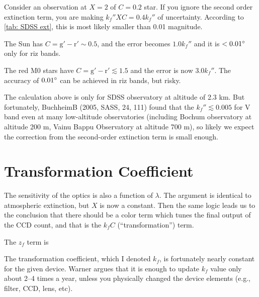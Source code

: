 \begin{ex}
Consider an observation at $ X = 2 $ of $ C = 0.2 $ star. If you ignore the second order extinction term, you are making $ k_f'' XC = 0.4 k_f'' $ of uncertainty. According to \cref{tab: SDSS ext}, this is most likely smaller than 0.01 magnitude. 

The Sun has $ C = \mathrm{g' - r'} \sim 0.5 $, and the error becomes $ 1.0 k_f'' $ and it is $ < \m{0.01} $ only for riz bands.

The red M0 stars have $ C = \mathrm{g' - r'} \lesssim 1.5 $ and the error is now $ 3.0 k_f'' $. The accuracy of $ \m{0.01} $ can be achieved in riz bands, but risky.
\end{ex}

The calculation above is only for SDSS observatory at altitude of 2.3 km. But fortunately, BuchheimB (2005, SASS, 24, 111) found that the $ k_f'' \lesssim 0.005 $ for V band even at many low-altitude observatories (including Bochum observatory at altitude 200 m, Vainu Bappu Observatory at altitude 700 m), so likely we expect the correction from the second-order extinction term is small enough.


\section{Transformation Coefficient}
The sensitivity of the optics is also a function of $ \lambda $. The argument is identical to atmospheric extinction, but $ X $ is now a constant. Then the same logic leads us to the conclusion that there should be a color term which tunes the final output of the CCD count, and that is the $ k_f C $ (``transformation'') term.

The $ z_f $ term is 

The transformation coefficient, which I denoted $ k_f $, is fortunately nearly constant for the given device. Warner argues that it is enough to update $ k_f $ value only about 2--4 times a year, unless you physically changed the device elements (e.g., filter, CCD, lens, etc).




